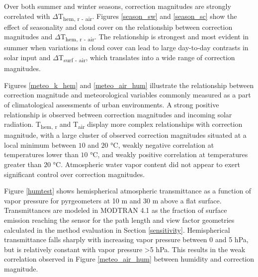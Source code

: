 \begin{bibunit}
Over both summer and winter seasons, correction magnitudes are strongly correlated with $\Delta$T\textsubscript{hem, r - air}. Figures \ref{season_sw} and \ref{season_sc} show the effect of seasonality and cloud cover on the relationship between correction magnitudes and $\Delta$T\textsubscript{hem, r - air}. The relationship is strongest and most evident in summer when variations in cloud cover can lead to large day-to-day contrasts in solar input and $\Delta$T\textsubscript{surf - air}, which translates into a wide range of correction magnitudes.

Figures \ref{meteo_k_hem} and \ref{meteo_air_hum}
 illustrate the relationship between correction magnitude and meteorological variables commonly measured as a part of climatological assessments of urban environments. A strong positive relationship is observed between correction magnitudes and incoming solar radiation. T\textsubscript{hem, r} and T\textsubscript{air} display more complex relationships with correction magnitude, with a large cluster of observed correction magnitudes situated at a local minimum between $10$ and $20$ \si{\degreeCelsius}, weakly negative correlation at temperatures lower than $10$ \si{\degreeCelsius}, and weakly positive correlation at temperatures greater than $20$ \si{\degreeCelsius}. Atmospheric water vapor content did not appear to exert significant control over correction magnitudes.

Figure \ref{humtest} shows hemispherical atmospheric transmittance as a function of vapor pressure for pyrgeometers at 10 \si{\meter} and 30 \si{\meter} above a flat surface. Transmittances are modeled in MODTRAN 4.1 as the fraction of surface emission reaching the sensor for the path length and view factor geometries calculated in the method evaluation in Section \ref{sensitivity}. Hemispherical transmittance falls sharply with increasing vapor pressure between 0 and 5 \si{\hecto\pascal}, but is relatively constant with vapor pressure \textgreater 5 \si{\hecto\pascal}. This results in the weak correlation observed in Figure \ref{meteo_air_hum} between humidity and correction magnitude.



\end{bibunit}
